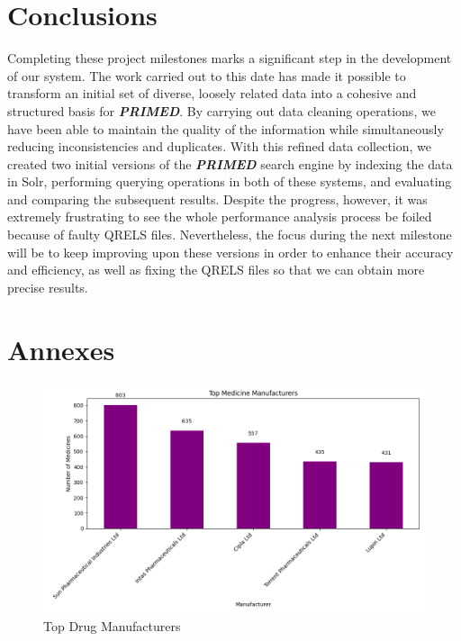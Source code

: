 \documentclass[sigconf]{acmart}
\begin{document}
\section{Conclusions}

Completing these project milestones marks a significant step in the development of our system. The work carried out to this date has made it possible to transform an initial set of diverse, loosely related data into a cohesive and structured basis for \textit{\textbf{PRIMED}}. By carrying out data cleaning operations, we have been able to maintain the quality of the information while simultaneously reducing inconsistencies and duplicates. With this refined data collection, we created two initial versions of the \textit{\textbf{PRIMED}} search engine by indexing the data in Solr, performing querying operations in both of these systems, and evaluating and comparing the subsequent results. Despite the progress, however, it was extremely frustrating to see the whole performance analysis process be foiled because of faulty QRELS files. Nevertheless, the focus during the next milestone will be to keep improving upon these versions in order to enhance their accuracy and efficiency, as well as fixing the QRELS files so that we can obtain more precise results.




\appendix
\section{Annexes}

\begin{figure}[H]
	\centering
	\includegraphics[width=\linewidth]{graphic1.png}
	\caption{Top Drug Manufacturers}
	\label{fig:topManufacturers}
  \end{figure}
\end{document}
